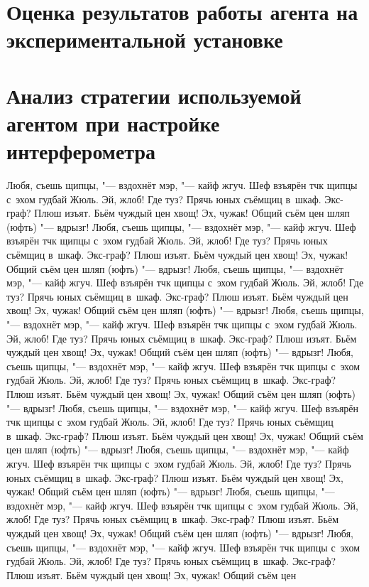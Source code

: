 \section{Оценка результатов работы агента на экспериментальной установке}

\section{Анализ стратегии используемой агентом при настройке интерферометра}

Любя, съешь щипцы, "--- вздохнёт мэр, "--- кайф жгуч. Шеф взъярён тчк щипцы
с~эхом гудбай Жюль. Эй, жлоб! Где туз? Прячь юных съёмщиц в~шкаф. Экс-граф?
Плюш изъят. Бьём чуждый цен хвощ! Эх, чужак! Общий съём цен шляп (юфть) "---
вдрызг! Любя, съешь щипцы, "--- вздохнёт мэр, "--- кайф жгуч. Шеф взъярён тчк
щипцы с~эхом гудбай Жюль. Эй, жлоб! Где туз? Прячь юных съёмщиц в~шкаф.
Экс-граф? Плюш изъят. Бьём чуждый цен хвощ! Эх, чужак! Общий съём цен шляп
(юфть) "--- вдрызг! Любя, съешь щипцы, "--- вздохнёт мэр, "--- кайф жгуч. Шеф
взъярён тчк щипцы с~эхом гудбай Жюль. Эй, жлоб! Где туз? Прячь юных съёмщиц
в~шкаф. Экс-граф? Плюш изъят. Бьём чуждый цен хвощ! Эх, чужак! Общий съём цен
шляп (юфть) "--- вдрызг! Любя, съешь щипцы, "--- вздохнёт мэр, "--- кайф жгуч.
Шеф взъярён тчк щипцы с~эхом гудбай Жюль. Эй, жлоб! Где туз? Прячь юных съёмщиц
в~шкаф. Экс-граф? Плюш изъят. Бьём чуждый цен хвощ! Эх, чужак! Общий съём цен
шляп (юфть) "--- вдрызг! Любя, съешь щипцы, "--- вздохнёт мэр, "--- кайф жгуч.
Шеф взъярён тчк щипцы с~эхом гудбай Жюль. Эй, жлоб! Где туз? Прячь юных съёмщиц
в~шкаф. Экс-граф? Плюш изъят. Бьём чуждый цен хвощ! Эх, чужак! Общий съём цен
шляп (юфть) "--- вдрызг! Любя, съешь щипцы, "--- вздохнёт мэр, "--- кайф жгуч.
Шеф взъярён тчк щипцы с~эхом гудбай Жюль. Эй, жлоб! Где туз? Прячь юных съёмщиц
в~шкаф. Экс-граф? Плюш изъят. Бьём чуждый цен хвощ! Эх, чужак! Общий съём цен
шляп (юфть) "--- вдрызг! Любя, съешь щипцы, "--- вздохнёт мэр, "--- кайф жгуч.
Шеф взъярён тчк щипцы с~эхом гудбай Жюль. Эй, жлоб! Где туз? Прячь юных съёмщиц
в~шкаф. Экс-граф? Плюш изъят. Бьём чуждый цен хвощ! Эх, чужак! Общий съём цен
шляп (юфть) "--- вдрызг! Любя, съешь щипцы, "--- вздохнёт мэр, "--- кайф жгуч.
Шеф взъярён тчк щипцы с~эхом гудбай Жюль. Эй, жлоб! Где туз? Прячь юных съёмщиц
в~шкаф. Экс-граф? Плюш изъят. Бьём чуждый цен хвощ! Эх, чужак! Общий съём цен
шляп (юфть) "--- вдрызг! Любя, съешь щипцы, "--- вздохнёт мэр, "--- кайф жгуч.
Шеф взъярён тчк щипцы с~эхом гудбай Жюль. Эй, жлоб! Где туз? Прячь юных съёмщиц
в~шкаф. Экс-граф? Плюш изъят. Бьём чуждый цен хвощ! Эх, чужак! Общий съём цен

